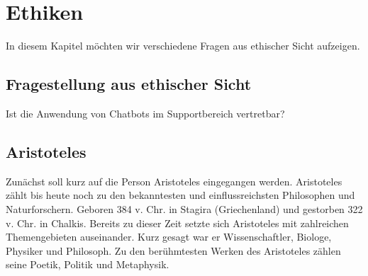 \section{Ethiken}
In diesem Kapitel möchten wir verschiedene Fragen aus ethischer Sicht aufzeigen. 

\subsection{Fragestellung aus ethischer Sicht}
Ist die Anwendung von Chatbots im Supportbereich vertretbar?

\subsection{Aristoteles}
Zunächst soll kurz auf die Person Aristoteles eingegangen werden. \newline
Aristoteles zählt bis heute noch zu den bekanntesten und einflussreichsten Philosophen und Naturforschern. Geboren 384 v. Chr. in Stagira (Griechenland) und gestorben 322 v. Chr. in Chalkis. Bereits zu dieser Zeit setzte sich Aristoteles mit zahlreichen Themengebieten auseinander. Kurz gesagt war er Wissenschaftler, Biologe, Physiker und Philosoph. Zu den berühmtesten Werken des Aristoteles zählen seine Poetik, Politik und Metaphysik.

